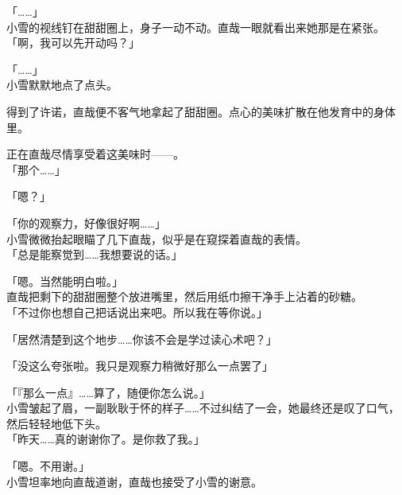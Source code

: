 「……」\\

小雪的视线钉在甜甜圈上，身子一动不动。直哉一眼就看出来她那是在紧张。\\

「啊，我可以先开动吗？」

「……」\\

小雪默默地点了点头。

得到了许诺，直哉便不客气地拿起了甜甜圈。点心的美味扩散在他发育中的身体里。

正在直哉尽情享受着这美味时——。\\

「那个……」

「嗯？」

「你的观察力，好像很好啊……」\\

小雪微微抬起眼瞄了几下直哉，似乎是在窥探着直哉的表情。\\

「总是能察觉到……我想要说的话。」

「嗯。当然能明白啦。」\\

直哉把剩下的甜甜圈整个放进嘴里，然后用纸巾擦干净手上沾着的砂糖。\\

「不过你也想自己把话说出来吧。所以我在等你说。」

「居然清楚到这个地步……你该不会是学过读心术吧？」

「没这么夸张啦。我只是观察力稍微好那么一点罢了」

「『那么一点』……算了，随便你怎么说。」\\

小雪皱起了眉，一副耿耿于怀的样子……不过纠结了一会，她最终还是叹了口气，然后轻轻地低下头。\\

「昨天……真的谢谢你了。是你救了我。」

「嗯。不用谢。」\\

小雪坦率地向直哉道谢，直哉也接受了小雪的谢意。
